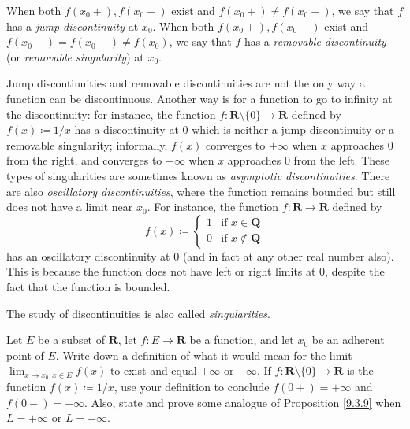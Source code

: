 \begin{note}
    When both \(f(x_0+), f(x_0-)\) exist and \(f(x_0+) \neq f(x_0-)\), we say that \(f\) has a \emph{jump discontinuity} at \(x_0\).
    When both \(f(x_0+), f(x_0-)\) exist and \(f(x_0+) = f(x_0-) \neq f(x_0)\), we say that \(f\) has a \emph{removable discontinuity} (or \emph{removable singularity}) at \(x_0\).
\end{note}

\begin{remark}\label{9.5.4}
    Jump discontinuities and removable discontinuities are not the only way a function can be discontinuous.
    Another way is for a function to go to infinity at the discontinuity:
    for instance, the function \(f : \mathbf{R} \setminus \{0\} \to \mathbf{R}\) defined by \(f(x) \coloneqq 1 / x\) has a discontinuity at \(0\) which is neither a jump discontinuity or a removable singularity;
    informally, \(f(x)\) converges to \(+\infty\) when \(x\) approaches \(0\) from the right, and converges to \(-\infty\) when \(x\) approaches \(0\) from the left.
    These types of singularities are sometimes known as \emph{asymptotic discontinuities}.
    There are also \emph{oscillatory discontinuities}, where the function remains bounded but still does not have a limit near \(x_0\).
    For instance, the function \(f : \mathbf{R} \to \mathbf{R}\) defined by
    \[
        f(x) \coloneqq \begin{cases}
            1 & \text{if } x \in \mathbf{Q}    \\
            0 & \text{if } x \notin \mathbf{Q}
        \end{cases}
    \]
    has an oscillatory discontinuity at \(0\) (and in fact at any other real number also).
    This is because the function does not have left or right limits at \(0\), despite the fact that the function is bounded.
\end{remark}

\begin{note}
    The study of discontinuities is also called \emph{singularities}.
\end{note}

\exercisesection

\begin{exercise}\label{ex 9.5.1}
    Let \(E\) be a subset of \(\mathbf{R}\), let \(f : E \to \mathbf{R}\) be a function, and let \(x_0\) be an adherent point of \(E\).
    Write down a definition of what it would mean for the limit \(\lim_{x \to x_0 ; x \in E} f(x)\) to exist and equal \(+\infty\) or \(-\infty\).
    If \(f : \mathbf{R} \setminus \{0\} \to \mathbf{R}\) is the function \(f(x) \coloneqq 1 / x\), use your definition to conclude \(f(0+) = +\infty\) and \(f(0-) = -\infty\).
    Also, state and prove some analogue of Proposition \ref{9.3.9} when \(L = +\infty\) or \(L = -\infty\).
\end{exercise}


